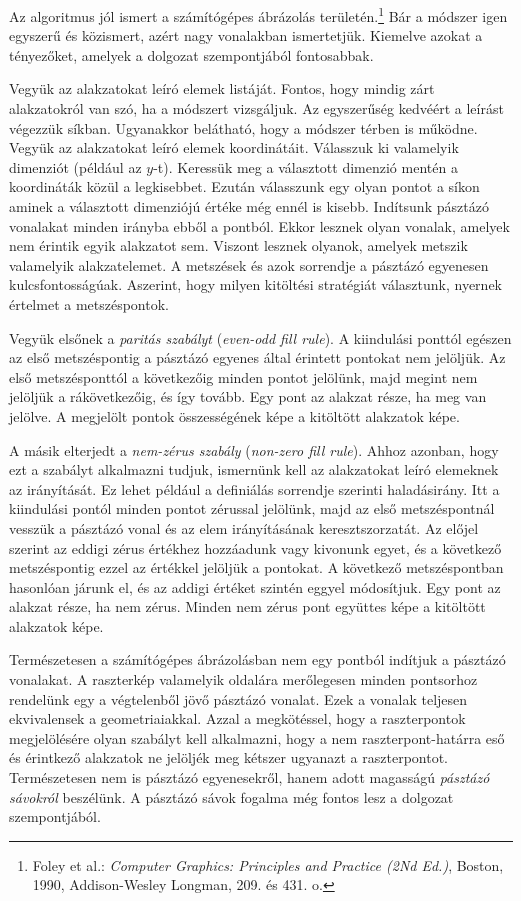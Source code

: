 \documentclass[12pt]{report}
\theoremstyle{definition}
\newcommand{\inenglish}[1]{\textsl{#1}}
\begin{document}
Az algoritmus jól ismert a számítógépes ábrázolás területén.\footnote{Foley et
al.: \emph{Computer Graphics: Principles and Practice (2Nd Ed.)}, Boston, 1990,
Addison-Wesley Longman, 209. és 431. o.} Bár a módszer igen egyszerű és
közismert, azért nagy vonalakban ismertetjük. Kiemelve azokat a tényezőket,
amelyek a dolgozat szempontjából fontosabbak.

Vegyük az alakzatokat leíró elemek listáját. Fontos, hogy mindig zárt
alakzatokról van szó, ha a módszert vizsgáljuk. Az egyszerűség kedvéért a
leírást végezzük síkban. Ugyanakkor belátható, hogy a módszer térben is működne.
Vegyük az alakzatokat leíró elemek koordinátáit. Válasszuk ki valamelyik
dimenziót (például az $y$-t). Keressük meg a választott dimenzió mentén a
koordináták közül a legkisebbet. Ezután válasszunk egy olyan pontot a síkon
aminek a választott dimenziójú értéke még ennél is kisebb. Indítsunk pásztázó
vonalakat minden irányba ebből a pontból. Ekkor lesznek olyan vonalak, amelyek
nem érintik egyik alakzatot sem. Viszont lesznek olyanok, amelyek metszik
valamelyik alakzatelemet. A metszések és azok sorrendje a pásztázó egyenesen
kulcsfontosságúak. Aszerint, hogy milyen kitöltési stratégiát választunk,
nyernek értelmet a metszéspontok.

Vegyük elsőnek a \emph{paritás szabályt} (\inenglish{even-odd fill rule}). A
kiindulási ponttól egészen az első metszéspontig a pásztázó egyenes által
érintett pontokat nem jelöljük. Az első metszésponttól a következőig minden
pontot jelölünk, majd megint nem jelöljük a rákövetkezőig, és így tovább. Egy
pont az alakzat része, ha meg van jelölve. A megjelölt pontok összességének képe
a kitöltött alakzatok képe.

A másik elterjedt a \emph{nem-zérus szabály} (\inenglish{non-zero fill rule}).
Ahhoz azonban, hogy ezt a szabályt alkalmazni tudjuk, ismernünk kell az
alakzatokat leíró elemeknek az irányítását. Ez lehet például a definiálás
sorrendje szerinti haladásirány. Itt a kiindulási pontól minden pontot zérussal
jelölünk, majd az első metszéspontnál vesszük a pásztázó vonal és az elem
irányításának keresztszorzatát. Az előjel szerint az eddigi zérus értékhez
hozzáadunk vagy kivonunk egyet, és a következő metszéspontig ezzel az értékkel
jelöljük a pontokat. A következő metszéspontban hasonlóan járunk el, és az
addigi értéket szintén eggyel módosítjuk. Egy pont az alakzat része, ha nem
zérus. Minden nem zérus pont együttes képe a kitöltött alakzatok képe.

Természetesen a számítógépes ábrázolásban nem egy pontból indítjuk a pásztázó
vonalakat. A raszterkép valamelyik oldalára merőlegesen minden pontsorhoz
rendelünk egy a végtelenből jövő pásztázó vonalat. Ezek a vonalak teljesen
ekvivalensek a geometriaiakkal. Azzal a megkötéssel, hogy a raszterpontok
megjelölésére olyan szabályt kell alkalmazni, hogy a nem raszterpont-határra eső
és érintkező alakzatok ne jelöljék meg kétszer ugyanazt a raszterpontot.
Természetesen nem is pásztázó egyenesekről, hanem adott magasságú \emph{pásztázó
sávokról} beszélünk. A pásztázó sávok fogalma még fontos lesz a dolgozat
szempontjából.
\end{document}
